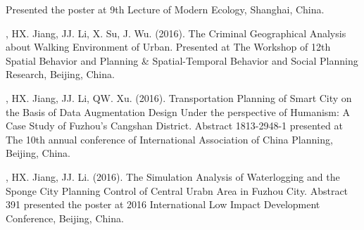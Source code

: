 \begin{etaremune}
    Presented the poster at 9th Lecture of Modern Ecology, Shanghai, China.
\item
    \Shaoqing, HX. Jiang, JJ. Li, X. Su, J. Wu. (2016).
    The Criminal Geographical Analysis about Walking Environment of Urban.
    Presented at The Workshop of 12th Spatial Behavior and Planning \& Spatial-Temporal Behavior and Social Planning Research, Beijing, China.
\item
    \Shaoqing, HX. Jiang, JJ. Li, QW. Xu. (2016).
    Transportation Planning of Smart City on the Basis of Data Augmentation Design Under the perspective of Humanism: A Case Study of Fuzhou’s Cangshan District.
    Abstract 1813-2948-1 presented at The 10th annual conference of International Association of China Planning, Beijing, China.
\item
    \Shaoqing, HX. Jiang, JJ. Li. (2016).
    The Simulation Analysis of Waterlogging and the Sponge City Planning Control of Central Urabn Area in Fuzhou City.
    Abstract 391 presented the poster at 2016 International Low Impact Development Conference, Beijing, China.
\end{etaremune}
